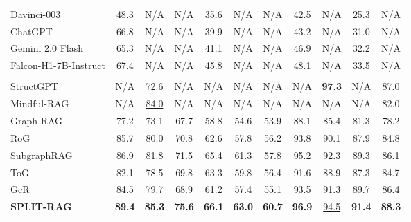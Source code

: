 \documentclass[sigconf]{acmart}
\newcommand{\NA}{\cellcolor{black!8}\textsc{N/A}}
\begin{document}
\begin{table}[h]
\begin{adjustbox}{max width=0.9\textwidth}
\begin{tabular}{l|ccc|ccc|cc|cc}
Davinci-003
& 48.3 & \NA & \NA
& 35.6 & \NA & \NA
& 42.5 & \NA
& 25.3 & \NA \\

ChatGPT
& 66.8 & \NA & \NA
& 39.9 & \NA & \NA
& 43.2 & \NA
& 31.0 & \NA \\

Gemini 2.0 Flash
& 65.3 & \NA & \NA
& 41.1 & \NA & \NA
& 46.9 & \NA
& 32.2 & \NA \\

Falcon-H1-7B-Instruct
& 67.4 & \NA & \NA
& 45.8 & \NA & \NA
& 48.1 & \NA
& 33.5 & \NA \\

\midrule
\rowcolor{black!10}\multicolumn{11}{l}{\textbf{KG+LLM methods}} \\

StructGPT~\cite{jiang2023structgpt}
& \NA & 72.6 & \NA
& \NA & \NA & \NA
& \NA & \textbf{97.3}
& \NA & \underline{87.0} \\

Mindful-RAG~\cite{agrawal2024mindful}
& \NA & \underline{84.0} & \NA
& \NA & \NA & \NA
& \NA & \NA
& \NA & 82.0 \\

Graph-RAG
& 77.2 & 73.1 & 67.7
& 58.8 & 54.6 & 53.9
& 88.1 & 85.4
& 81.3 & 78.2 \\

RoG~\cite{luo2023reasoning}
& 85.7 & 80.0 & 70.8
& 62.6 & 57.8 & 56.2
& 93.8 & 90.1
& 87.9 & 84.8 \\

SubgraphRAG~\cite{li2024simple}
& \underline{86.9} & \underline{81.8} & \underline{71.5}
& \underline{65.4} & \underline{61.3} & \underline{57.8}
& \underline{95.2} & 92.3
& 89.3 & 86.1 \\

ToG~\cite{sun2023think}
& 82.1 & 78.5 & 69.8
& 63.3 & 59.8 & 56.4
& 91.6 & 88.9
& 87.3 & 84.7 \\

GcR~\cite{luo2024graph}
& 84.5 & 79.7 & 68.9
& 61.2 & 57.4 & 55.1
& 93.5 & 91.3
& \underline{89.7} & 86.4 \\

\textbf{SPLIT-RAG} 
& \textbf{89.4} & \textbf{85.3} & \textbf{75.6}
& \textbf{66.1} & \textbf{63.0} & \textbf{60.7}
& \textbf{96.9} & \underline{94.5}
& \textbf{91.4} & \textbf{88.3} \\
\midrule

\end{tabular}
\end{adjustbox}
\end{table}
\end{document}
